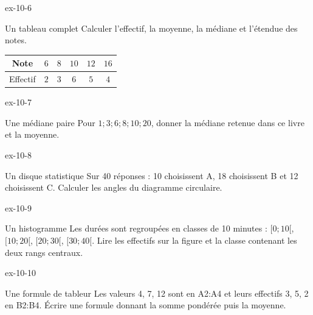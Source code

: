 \clearpage{}
\begin{blocLivre}{ex-10-6}\begin{exercice}[2]{Un tableau complet}
Calculer l’effectif, la moyenne, la médiane et l’étendue des notes.\begin{center}\renewcommand{\arraystretch}{1.35}\begin{tabular}{c|ccccc}\toprule
Note & $6$ & $8$ & $10$ & $12$ & $16$\\\midrule
Effectif & $2$ & $3$ & $6$ & $5$ & $4$\\
\bottomrule\end{tabular}\end{center}
\end{exercice}\end{blocLivre}
\begin{blocLivre}{ex-10-7}\begin{exercice}[2]{Une médiane paire}
Pour $1;3;6;8;10;20$, donner la médiane retenue dans ce livre et la moyenne.
\end{exercice}\end{blocLivre}
\begin{blocLivre}{ex-10-8}\begin{exercice}[2]{Un disque statistique}
Sur 40 réponses : 10 choisissent A, 18 choisissent B et 12 choisissent C. Calculer les angles du diagramme circulaire.
\label{fig-ex-10-8}
\end{exercice}\end{blocLivre}
\begin{blocLivre}{ex-10-9}\begin{exercice}[2]{Un histogramme}
Les durées sont regroupées en classes de 10 minutes : $[0;10[$, $[10;20[$, $[20;30[$, $[30;40[$. Lire les effectifs sur la figure et la classe contenant les deux rangs centraux.
\label{fig-ex-10-9}
\end{exercice}\end{blocLivre}
\begin{blocLivre}{ex-10-10}\begin{exercice}[2]{Une formule de tableur}
Les valeurs 4, 7, 12 sont en A2:A4 et leurs effectifs 3, 5, 2 en B2:B4. Écrire une formule donnant la somme pondérée puis la moyenne.
\end{exercice}\end{blocLivre}

